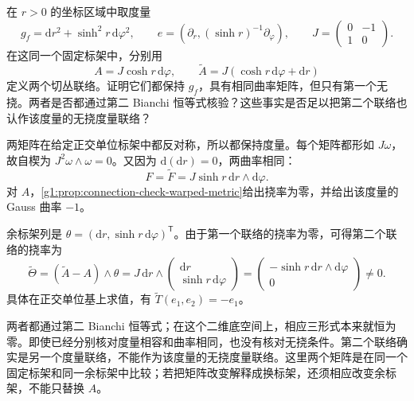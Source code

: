\begin{exercise}\label{g1:ex:connection-check-same-curvature}
	在 \(r>0\) 的坐标区域中取度量
	\[
		g_f=\mathrm{d}r^2+\sinh^2r\,\mathrm{d}\varphi^2,
		\qquad e=(\partial_r,(\sinh r)^{-1}\partial_\varphi),
		\qquad J=\begin{pmatrix}0&-1\\1&0\end{pmatrix}.
	\]
	在这同一个固定标架中，分别用
	\[
		A=J\cosh r\,\mathrm{d}\varphi,\qquad
		\widetilde A=J(\cosh r\,\mathrm{d}\varphi+\mathrm{d}r)
	\]
	定义两个切丛联络。证明它们都保持 \(g_f\)，具有相同曲率矩阵，但只有第一个无挠。两者是否都通过第二 Bianchi 恒等式核验？这些事实是否足以把第二个联络也认作该度量的无挠度量联络？
\end{exercise}
\begin{solution}
	两矩阵在给定正交单位标架中都反对称，所以都保持度量。每个矩阵都形如 \(J\omega\)，故自楔为 \(J^2\omega\wedge\omega=0\)。又因为 \(\mathrm{d}(\mathrm{d}r)=0\)，两曲率相同：
	\[
		F=\widetilde F=J\sinh r\,\mathrm{d}r\wedge\mathrm{d}\varphi.
	\]
	对 \(A\)，\cref{g1:prop:connection-check-warped-metric}给出挠率为零，并给出该度量的 Gauss 曲率 \(-1\)。

	余标架列是 \(\theta=(\mathrm{d}r,\sinh r\,\mathrm{d}\varphi)^{\mathsf T}\)。由于第一个联络的挠率为零，可得第二个联络的挠率为
	\[
		\widetilde\Theta
		=(\widetilde A-A)\wedge\theta
		=J\,\mathrm{d}r\wedge
		\begin{pmatrix}\mathrm{d}r\\\sinh r\,\mathrm{d}\varphi\end{pmatrix}
		=\begin{pmatrix}
			-\sinh r\,\mathrm{d}r\wedge\mathrm{d}\varphi\\0
		\end{pmatrix}\ne0.
	\]
	具体在正交单位基上求值，有 \(\widetilde T(e_1,e_2)=-e_1\)。

	两者都通过第二 Bianchi 恒等式；在这个二维底空间上，相应三形式本来就恒为零。即使已经分别核对度量相容和曲率相同，也没有核对无挠条件。第二个联络确实是另一个度量联络，不能作为该度量的无挠度量联络。这里两个矩阵是在同一个固定标架和同一余标架中比较；若把矩阵改变解释成换标架，还须相应改变余标架，不能只替换 \(A\)。
\end{solution}

